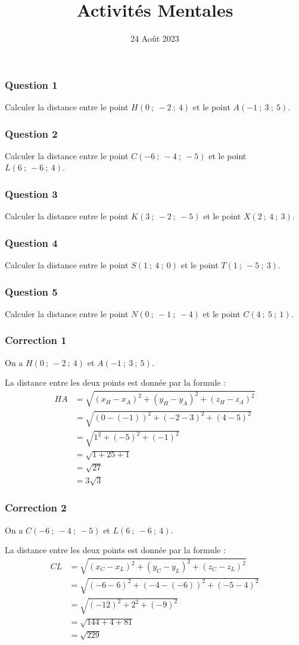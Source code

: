 \documentclass[15pt, mathserif]{beamer}
\title{Activités Mentales}
\date{24 Août 2023}
\begin{document}
\begin{frame}
    \titlepage
\end{frame}

\begin{frame} 
	\frametitle{Question 1}
Calculer la distance entre le point $H(0~;~-2~;~4)$ et le point $ A(-1~;~3~;~5)$.\end{frame}


\begin{frame} 
	\frametitle{Question 2}
Calculer la distance entre le point $C(-6~;~-4~;~-5)$ et le point $ L(6~;~-6~;~4)$.\end{frame}


\begin{frame} 
	\frametitle{Question 3}
Calculer la distance entre le point $K(3~;~-2~;~-5)$ et le point $ X(2~;~4~;~3)$.\end{frame}


\begin{frame} 
	\frametitle{Question 4}
Calculer la distance entre le point $S(1~;~4~;~0)$ et le point $ T(1~;~-5~;~3)$.\end{frame}


\begin{frame} 
	\frametitle{Question 5}
Calculer la distance entre le point $N(0~;~-1~;~-4)$ et le point $ C(4~;~5~;~1)$.\end{frame}


\begin{frame}
\vspace{-10mm}
	\frametitle{Correction 1}
On a $H(0~;~-2~;~4)$ et $A(-1~;~3~;~5)$.

\medskip

La distance entre les deux points est donnée par la formule : \begin{align*} HA &=\sqrt{(x_H-x_A)^2 + (y_H-y_A)^2 + (z_H-z_A)^2} \\ &= \sqrt{(0-\left(-1\right))^2 + (-2-3)^2 + (4-5)^2} \\ &= \sqrt{1^2 +\left(-5\right)^2 +\left(-1\right)^2} \\ &= \sqrt{1+25+1} \\ &= \sqrt{27}  \\ &=3 \sqrt{3} \end{align*}\end{frame}


\begin{frame}
\vspace{-10mm}
	\frametitle{Correction 2}
On a $C(-6~;~-4~;~-5)$ et $L(6~;~-6~;~4)$.

\medskip

La distance entre les deux points est donnée par la formule : \begin{align*} CL &=\sqrt{(x_C-x_L)^2 + (y_C-y_L)^2 + (z_C-z_L)^2} \\ &= \sqrt{(-6-6)^2 + (-4-\left(-6\right))^2 + (-5-4)^2} \\ &= \sqrt{\left(-12\right)^2 +2^2 +\left(-9\right)^2} \\ &= \sqrt{144+4+81} \\ &= \sqrt{229}  \end{align*}\end{frame}
\end{document}
